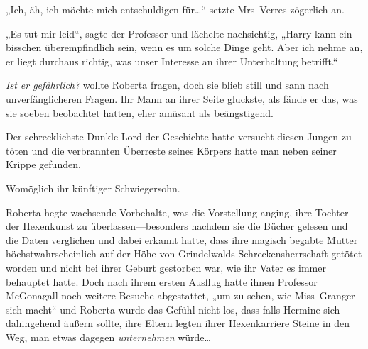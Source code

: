 „Ich, äh, ich möchte mich entschuldigen für…“ setzte Mrs~Verres zögerlich an.

„Es tut mir leid“, sagte der Professor und lächelte nachsichtig, „Harry kann ein bisschen überempfindlich sein, wenn es um solche Dinge geht. Aber ich nehme an, er liegt durchaus richtig, was unser Interesse an ihrer Unterhaltung betrifft.“

\emph{Ist er gefährlich?} wollte Roberta fragen, doch sie blieb still und sann nach unverfänglicheren Fragen. Ihr Mann an ihrer Seite gluckste, als fände er das, was sie soeben beobachtet hatten, eher amüsant als beängstigend.

Der schrecklichste Dunkle Lord der Geschichte hatte versucht diesen Jungen zu töten und die verbrannten Überreste seines Körpers hatte man neben seiner Krippe gefunden.

Womöglich ihr künftiger Schwiegersohn.

Roberta hegte wachsende Vorbehalte, was die Vorstellung anging, ihre Tochter der Hexenkunst zu überlassen—besonders nachdem sie die Bücher gelesen und die Daten verglichen und dabei erkannt hatte, dass ihre magisch begabte Mutter höchstwahrscheinlich auf der Höhe von Grindelwalds Schreckensherrschaft getötet worden und nicht bei ihrer Geburt gestorben war, wie ihr Vater es immer behauptet hatte. Doch nach ihrem ersten Ausflug hatte ihnen Professor McGonagall noch weitere Besuche abgestattet, „um zu sehen, wie Miss~Granger sich macht“ und Roberta wurde das Gefühl nicht los, dass falls Hermine sich dahingehend äußern sollte, ihre Eltern legten ihrer Hexenkarriere Steine in den Weg, man etwas dagegen \emph{unternehmen} würde…

